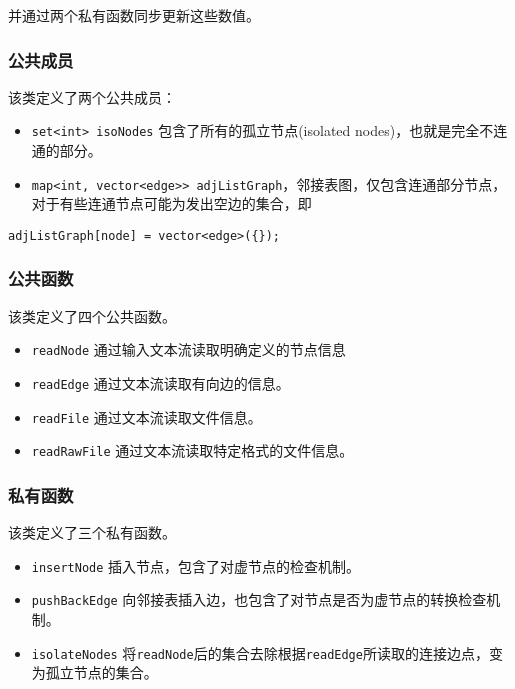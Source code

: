 \documentclass[
]{article}
\begin{document}
并通过两个私有函数同步更新这些数值。

\hypertarget{header-n81}{%
\subsubsection{公共成员}\label{header-n81}}

该类定义了两个公共成员：

\begin{itemize}
\item
  \texttt{set\textless{}int\textgreater{}\ isoNodes}
  包含了所有的孤立节点(isolated nodes)，也就是完全不连通的部分。
\item
  \texttt{map\textless{}int,\ vector\textless{}edge\textgreater{}\textgreater{}\ adjListGraph}，邻接表图，仅包含连通部分节点，对于有些连通节点可能为发出空边的集合，即
\end{itemize}

\begin{verbatim}
adjListGraph[node] = vector<edge>({});
\end{verbatim}

\hypertarget{header-n89}{%
\subsubsection{公共函数}\label{header-n89}}

该类定义了四个公共函数。

\begin{itemize}
\item
  \texttt{readNode} 通过输入文本流读取明确定义的节点信息
\item
  \texttt{readEdge} 通过文本流读取有向边的信息。
\item
  \texttt{readFile} 通过文本流读取文件信息。
\item
  \texttt{readRawFile} 通过文本流读取特定格式的文件信息。
\end{itemize}

\hypertarget{header-n100}{%
\subsubsection{私有函数}\label{header-n100}}

该类定义了三个私有函数。

\begin{itemize}
\item
  \texttt{insertNode} 插入节点，包含了对虚节点的检查机制。
\item
  \texttt{pushBackEdge}
  向邻接表插入边，也包含了对节点是否为虚节点的转换检查机制。
\item
  \texttt{isolateNodes}
  将\texttt{readNode}后的集合去除根据\texttt{readEdge}所读取的连接边点，变为孤立节点的集合。
\end{itemize}
\end{document}
